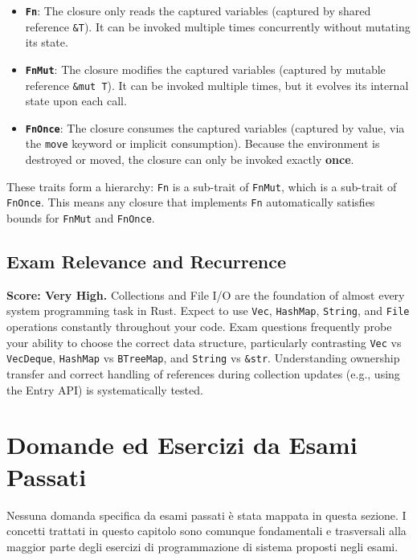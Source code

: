 \begin{itemize}
    \item \textbf{\texttt{Fn}}: The closure only reads the captured variables (captured by shared reference \texttt{\&T}). It can be invoked multiple times concurrently without mutating its state.
    \item \textbf{\texttt{FnMut}}: The closure modifies the captured variables (captured by mutable reference \texttt{\&mut T}). It can be invoked multiple times, but it evolves its internal state upon each call.
    \item \textbf{\texttt{FnOnce}}: The closure consumes the captured variables (captured by value, via the \texttt{move} keyword or implicit consumption). Because the environment is destroyed or moved, the closure can only be invoked exactly \textbf{once}.
\end{itemize}

These traits form a hierarchy: \texttt{Fn} is a sub-trait of \texttt{FnMut}, which is a sub-trait of \texttt{FnOnce}. This means any closure that implements \texttt{Fn} automatically satisfies bounds for \texttt{FnMut} and \texttt{FnOnce}.


\subsection*{Exam Relevance and Recurrence}
\textbf{Score: Very High.} Collections and File I/O are the foundation of almost every system programming task in Rust. Expect to use \texttt{Vec}, \texttt{HashMap}, \texttt{String}, and \texttt{File} operations constantly throughout your code. Exam questions frequently probe your ability to choose the correct data structure, particularly contrasting \texttt{Vec} vs \texttt{VecDeque}, \texttt{HashMap} vs \texttt{BTreeMap}, and \texttt{String} vs \texttt{\&str}. Understanding ownership transfer and correct handling of references during collection updates (e.g., using the Entry API) is systematically tested.

\section{Domande ed Esercizi da Esami Passati}

Nessuna domanda specifica da esami passati è stata mappata in questa sezione. I concetti trattati in questo capitolo sono comunque fondamentali e trasversali alla maggior parte degli esercizi di programmazione di sistema proposti negli esami.
